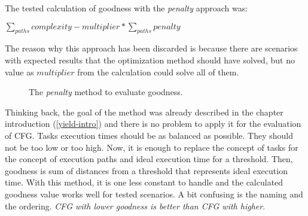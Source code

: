 The tested calculation of goodness with the \emph{penalty} approach was:

\begin{center}
$\sum_{paths}{complexity} - multiplier * \sum_{paths}{penalty}$
\end{center}

The reason why this approach has been discarded is because there are scenarios with expected results that the optimization method should have solved, but no value as $multiplier$ from the calculation could solve all of them.

\begin{figure}[h!]
\caption{The \emph{penalty} method to evaluate goodness.}
\label{yield-penalty}
\centering
\vspace{0.5cm}
\end{figure}

Thinking back, the goal of the method was already described in the chapter introduction (\ref{yield-intro}) and there is no problem to apply it for the evaluation of CFG. Tasks execution times should be as balanced as possible. They should not be too low or too high. Now, it is enough to replace the concept of tasks for the concept of execution paths and ideal execution time for a threshold. Then, goodness is sum of distances from a threshold that represents ideal execution time. With this method, it is one less constant to handle and the calculated goodness value works well for tested scenarios. A bit confusing is the naming and the ordering. \emph{CFG with lower goodness is better than CFG with higher}.

